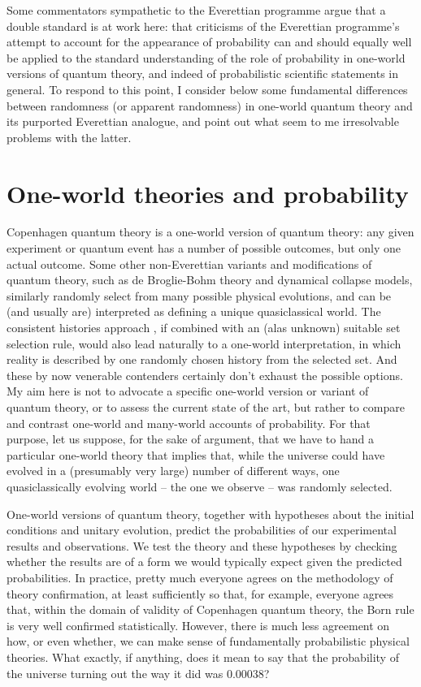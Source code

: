 \documentclass[aps,
pra,epsfig]{revtex4}
\begin{document}
Some commentators sympathetic to the Everettian programme\cite{greavesmyrvoldvol, papineauvol} 
argue that a double standard is at work here: that criticisms
of the Everettian programme's attempt to account for the appearance
of probability can and should equally well be applied to the
standard understanding of the role of probability in one-world
versions of quantum theory, and indeed of probabilistic scientific
statements in general.   To respond to this point, I consider below
some fundamental differences between 
randomness (or apparent randomness) in one-world quantum theory and 
its purported Everettian analogue, and point out what seem to me
irresolvable problems with the latter.

\section{One-world theories and probability}\label{oneworldprob}

Copenhagen quantum theory is a one-world version of quantum theory:
any given experiment or quantum event has a number of possible
outcomes, but only one actual outcome.  Some other non-Everettian
variants and modifications of quantum theory, such as de Broglie-Bohm
theory and dynamical collapse models, similarly randomly select from
many possible physical evolutions, and can be (and usually are)
interpreted as defining a unique quasiclassical world.  The consistent
histories approach \cite{hartlevol}, if combined with 
an (alas unknown) suitable set
selection rule, would also lead naturally to a one-world
interpretation, in which reality is described by one randomly chosen
history from the selected set.  And these by now venerable contenders
certainly don't exhaust the possible options.\cite{akoneworld}
My aim here is not to advocate a specific one-world version or variant
of quantum theory, or to assess the current state of the art, but
rather to compare and contrast one-world and many-world accounts of
probability.  For that purpose, let us suppose, for the sake of
argument, that we have to hand a particular one-world theory that 
implies that, while the universe could have evolved in a (presumably
very large) number of different ways, one quasiclassically evolving
world -- the one we observe -- was randomly selected.

One-world versions of quantum theory, together with hypotheses about
the initial conditions and unitary evolution, predict the
probabilities of our experimental results and observations.  We test
the theory and these hypotheses by checking whether the results are of
a form we would typically expect given the predicted probabilities.
In practice, pretty much everyone agrees on the methodology of theory
confirmation, at least sufficiently so that, for example, everyone
agrees that, within the domain of validity of Copenhagen quantum
theory, the Born rule is very well confirmed statistically.  However,
there is much less agreement on how, or even whether, we can make
sense of fundamentally probabilistic physical theories.  What exactly, if
anything, does it mean to say that the probability of the universe
turning out the way it did was $0.00038$?
\end{document}
